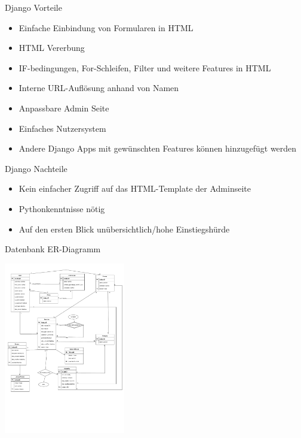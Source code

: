 \documentclass[english,hangout]{beamer}
\begin{document}
\begin{frame}{Django Vorteile}
\begin{itemize}
 \item Einfache Einbindung von Formularen in HTML
 \item HTML Vererbung
 \item IF-bedingungen, For-Schleifen, Filter und weitere Features in HTML
 \item Interne URL-Auflösung anhand von Namen
 \item Anpassbare Admin Seite
 \item Einfaches Nutzersystem
 \item Andere Django Apps mit gewünschten Features können hinzugefügt werden
\end{itemize}
\end{frame}

\begin{frame}{Django Nachteile}
\begin{itemize}
 \item Kein einfacher Zugriff auf das HTML-Template der Adminseite
 \item Pythonkenntnisse nötig
 \item Auf den ersten Blick unübersichtlich/hohe Einstiegshürde
\end{itemize}
\end{frame}

\begin{frame}{Datenbank ER-Diagramm}
 \begin{center}
\includegraphics[height=7.5cm]{dynexgen-erd.pdf}
\end{center}
\vspace{-6mm}
\end{frame}
\end{document}
